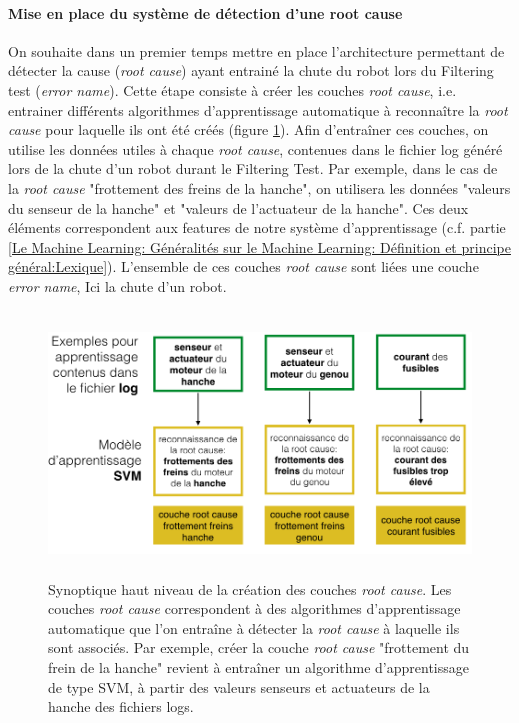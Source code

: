 \paragraph{Mise en place du système de détection d'une root cause}
On souhaite dans un premier temps mettre en place l'architecture permettant de détecter la cause (\emph{root cause}) ayant entrainé la chute du robot lors du Filtering test (\emph{error name}). Cette étape consiste à créer les couches \emph{root cause}, i.e. entrainer différents algorithmes d'apprentissage automatique à reconnaître la \emph{root cause} pour laquelle ils ont été créés (figure \ref{fig:Creation des couches root cause}). Afin d'entraîner ces couches, on utilise les données utiles à chaque \emph{root cause}, contenues dans le fichier log généré lors de la chute d'un robot durant le Filtering Test. Par exemple, dans le cas de la \emph{root cause} "frottement des freins de la hanche", on utilisera les données "valeurs du senseur de la hanche" et "valeurs de l'actuateur de la hanche". Ces deux éléments correspondent aux features de notre système d'apprentissage (c.f. partie \ref{Le Machine Learning: Généralités sur le Machine Learning: Définition et principe général:Lexique}). L'ensemble de ces couches \emph{root cause} sont liées une couche \emph{error name}, Ici la chute d'un robot.

\begin{figure}[h]
	\centering\includegraphics[height=7cm]{images/synoptique_root.png}
	\caption[Création des couches root cause]{Synoptique haut niveau de la création des couches \emph{root cause}. Les couches \emph{root cause} correspondent à des algorithmes d'apprentissage automatique que l'on entraîne à détecter la \emph{root cause} à laquelle ils sont associés. Par exemple, créer la couche \emph{root cause} "frottement du frein de la hanche" revient à entraîner un algorithme d'apprentissage de type SVM, à partir des valeurs senseurs et actuateurs de la hanche des fichiers logs.}
	\label{fig:Creation des couches root cause}
\end{figure}

